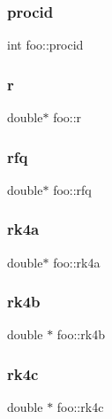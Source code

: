 \subsubsection{\texorpdfstring{procid}{procid}}
{\footnotesize\ttfamily int foo\+::procid}

\mbox{\label{structfoo_a8532cd651cdeaf8abb631238ab86f4ac}} 
\subsubsection{\texorpdfstring{r}{r}}
{\footnotesize\ttfamily double$\ast$ foo\+::r}

\mbox{\label{structfoo_a6e2cc6e126c113d2663ade1c7b78c69e}} 
\subsubsection{\texorpdfstring{rfq}{rfq}}
{\footnotesize\ttfamily double$\ast$ foo\+::rfq}

\mbox{\label{structfoo_a04f68d31dacc490f9ed243b07f82f961}} 
\subsubsection{\texorpdfstring{rk4a}{rk4a}}
{\footnotesize\ttfamily double$\ast$ foo\+::rk4a}

\mbox{\label{structfoo_aed5bda8434e6b56f5c3ed87e7a0756b8}} 
\subsubsection{\texorpdfstring{rk4b}{rk4b}}
{\footnotesize\ttfamily double $\ast$ foo\+::rk4b}

\mbox{\label{structfoo_af5e9ef96eb6874d1d0bd73457add9db8}} 
\subsubsection{\texorpdfstring{rk4c}{rk4c}}
{\footnotesize\ttfamily double $\ast$ foo\+::rk4c}

